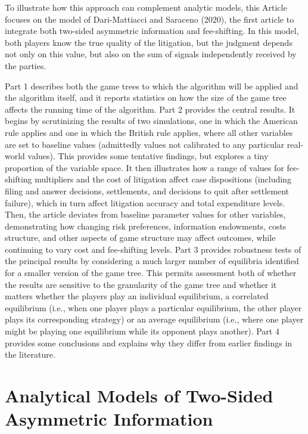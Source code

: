 \documentclass{article}
\begin{document}
To illustrate how this approach can complement analytic models, this Article focuses on the model of Dari-Mattiacci and Saraceno (2020), the first article to integrate both two-sided asymmetric information and fee-shifting. In this model, both players know the true quality of the litigation, but the judgment depends not only on this value, but also on the sum of signals independently received by the parties. 

Part 1 describes both the game trees to which the algorithm will be applied and the algorithm itself, and it reports statistics on how the size of the game tree affects the running time of the algorithm. Part 2 provides the central results. It begins by scrutinizing the results of two simulations, one in which the American rule applies and one in which the British rule applies, where all other variables are set to baseline values (admittedly values not calibrated to any particular real-world values). This provides some tentative findings, but explores a tiny proportion of the variable space. It then illustrates how a range of values for fee-shifting multipliers and the cost of litigation affect case dispositions (including filing and answer decisions, settlements, and decisions to quit after settlement failure), which in turn affect litigation accuracy and total expenditure levels. Then, the article deviates from baseline parameter values for other variables, demonstrating how changing risk preferences, information endowments, costs structure, and other aspects of game structure may affect outcomes, while continuing to vary cost and fee-shifting levels. Part 3 provides robustness tests of the principal results by considering a much larger number of equilibria identified for a smaller version of the game tree. This permits assessment both of whether the results are sensitive to the granularity of the game tree and whether it matters whether the players play an individual equilibrium, a correlated equilibrium (i.e., when one player plays a particular equilibrium, the other player plays its corresponding strategy) or an average equilibrium (i.e., where one player might be playing one equilibrium while its opponent plays another). Part 4 provides some conclusions and explains why they differ from earlier findings in the literature.

\section{Analytical Models of Two-Sided Asymmetric Information}
\end{document}
